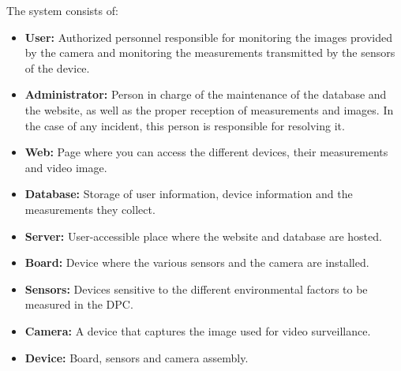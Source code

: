 \begin{figure}[H]
{}
\end{figure}

The system consists of:
\begin{itemize}
	\item \textbf{User:} Authorized personnel responsible for monitoring the images provided by the camera and monitoring the measurements transmitted by the sensors of the device.
	\item \textbf{Administrator:} Person in charge of the maintenance of the database and the website, as well as the proper reception of measurements and images. In the case of any incident, this person is responsible for resolving it.
	\item \textbf{Web:} Page where you can access the different devices, their measurements and video image.
	\item \textbf{Database:} Storage of user information, device information and the measurements they collect.
	\item \textbf{Server:} User-accessible place where the website and database are hosted.
	\item \textbf{Board:} Device where the various sensors and the camera are installed.
	\item \textbf{Sensors:} Devices sensitive to the different environmental factors to be measured in the DPC\@.
	\item \textbf{Camera:} A device that captures the image used for video surveillance.
	\item \textbf{Device:} Board, sensors and camera assembly.
\end{itemize}

